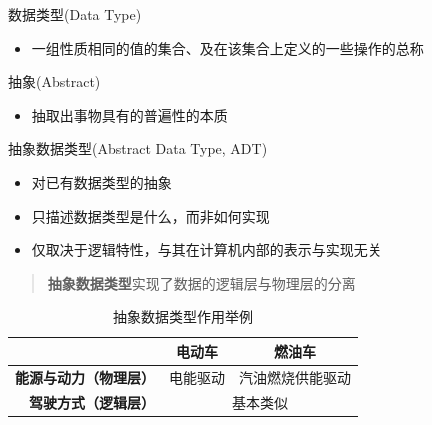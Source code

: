 \begin{frame}{\insertsubsectionhead}
	\begin{block}{数据类型(Data Type)}
		\begin{itemize}
			\item 一组性质相同的值的\alert{集合}、及在该集合上定义的一些\alert{操作}的总称
		\end{itemize}
	\end{block}
	\pause
	\begin{block}{抽象(Abstract)}
		\begin{itemize}
			\item 抽取出事物具有的\alert{普遍性}的本质
		\end{itemize}
	\end{block}
	\pause
	\begin{block}{抽象数据类型(Abstract Data Type, ADT)}
		\begin{itemize}
			\item 对已有数据类型的抽象
			\item 只描述数据类型\alert{是什么}，而非如何实现
			\item 仅取决于\alert{逻辑特性}，与其在计算机内部的表示与实现\footnotemark{}无关
		\end{itemize}
	\end{block}
\end{frame}

\begin{frame}{\insertsubsectionhead}
	\begin{quote}
		\textbf{抽象数据类型}实现了数据的\alert{逻辑层}与\alert{物理层}的分离
	\end{quote}
	\pause
	\begin{table}[h]
		\small
		\centering
		\caption{抽象数据类型作用举例}
		\begin{tabular}{rcc}
			\toprule
			                            & \textbf{电动车}             & \textbf{燃油车} \\
			\midrule
			\textbf{能源与动力（\alert{物理层}）} & 电能驱动                     & 汽油燃烧供能驱动     \\
			\textbf{驾驶方式（\alert{逻辑层}）}  & \multicolumn{2}{c}{基本类似}                \\
			\bottomrule
		\end{tabular}
		\label{tab:ele_gas}
	\end{table}
\end{frame}

